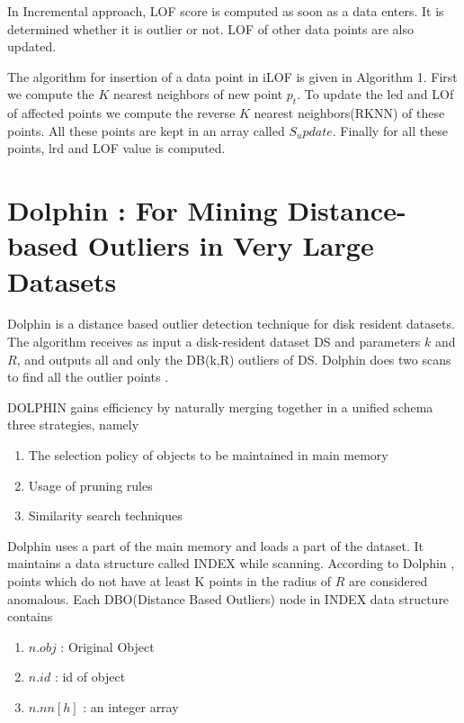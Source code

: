 In Incremental approach, LOF score is computed as soon as a data enters. It is determined whether it is outlier or not. LOF of other data points are also updated. 


The algorithm for insertion of a data point in iLOF is given in Algorithm 1. First we compute the $K$ nearest neighbors of new point $p_t$. To update the led and LOf of affected points we compute the reverse $K$ nearest neighbors(RKNN) of these points. All these points are kept in an array called $S_update$. Finally for all these points, lrd and LOF value is computed.  

	

\section{Dolphin : For Mining Distance-based Outliers
	in Very Large Datasets}

Dolphin is a distance based outlier detection technique for disk resident datasets. The algorithm receives
as input a disk-resident dataset DS and parameters $k$ and $R$, and outputs all
and only the DB(k,R) outliers of DS. Dolphin does two scans to find all the outlier points \cite{e}.

\par 
DOLPHIN gains efficiency by naturally merging together in a unified
schema three strategies, namely

\begin{enumerate}
	\item 
	The selection policy of objects to be maintained in main memory
	
	\item Usage of pruning rules
	\item Similarity search techniques
\end{enumerate}


Dolphin uses a part of the main memory and loads a part of the dataset. It maintains a data structure called INDEX while scanning. According to Dolphin , points which do not have at least K points in the radius of $R$ are considered anomalous. Each DBO(Distance Based Outliers) node in INDEX data structure contains

\begin{enumerate}
	\item $n.obj$ : Original Object 
	\item $n.id$ : id of object 
	\item $n.nn[h]$ : an integer array  
\end{enumerate}

